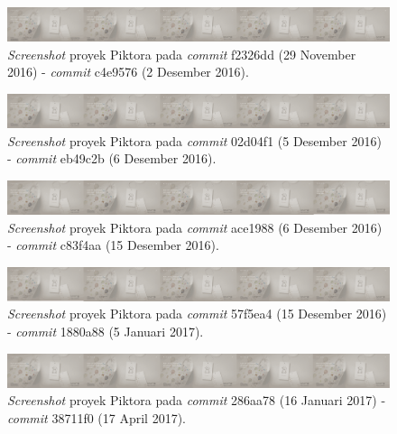\begin{enumerate}
\begin{figure}[H]
	
		\includegraphics[scale=0.3]{Gambar/Untitled-7.png}
	\caption{\textit{Screenshot} proyek Piktora pada \textit{commit} f2326dd (29 November 2016) - \textit{commit} c4e9576 (2 Desember 2016).}
	\label{fig:c7}
\end{figure}

\begin{figure}[H]
	
		\includegraphics[scale=0.3]{Gambar/Untitled-8.png}
	\caption{\textit{Screenshot} proyek Piktora pada \textit{commit} 02d04f1 (5 Desember 2016) - \textit{commit} eb49c2b (6 Desember 2016).}
	\label{fig:c8}
\end{figure}


\begin{figure}[H]
	
		\includegraphics[scale=0.3]{Gambar/Untitled-9.png}
	\caption{\textit{Screenshot} proyek Piktora pada \textit{commit} ace1988 (6 Desember 2016) - \textit{commit} c83f4aa (15 Desember 2016).}
	\label{fig:c9}
\end{figure}

\begin{figure}[H]
	
		\includegraphics[scale=0.3]{Gambar/Untitled-10.png}
	\caption{\textit{Screenshot} proyek Piktora pada \textit{commit} 57f5ea4 (15 Desember 2016) - \textit{commit} 1880a88 (5 Januari 2017).}
	\label{fig:c10}
\end{figure}

\begin{figure}[H]
	
		\includegraphics[scale=0.3]{Gambar/Untitled-11.png}
	\caption{\textit{Screenshot} proyek Piktora pada \textit{commit} 286aa78 (16 Januari 2017) - \textit{commit} 38711f0 (17 April 2017).}
	\label{fig:c11}
\end{figure}



\end{enumerate}
